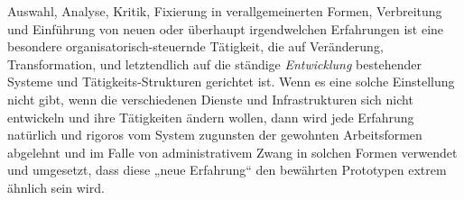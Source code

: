 \documentclass[11pt,a4paper]{article}
\begin{document}
Auswahl, Analyse, Kritik, Fixierung in verallgemeinerten Formen, Verbreitung
und Einführung von neuen oder überhaupt irgendwelchen Erfahrungen ist eine
besondere organisatorisch-steuernde Tätigkeit, die auf Veränderung,
Transformation, und letztendlich auf die ständige \emph{Entwicklung}
bestehender Systeme und Tätigkeits-Strukturen gerichtet ist. Wenn es eine
solche Einstellung nicht gibt, wenn die verschiedenen Dienste und
Infrastrukturen sich nicht entwickeln und ihre Tätigkeiten ändern wollen, dann
wird jede Erfahrung natürlich und rigoros vom System zugunsten der gewohnten
Arbeitsformen abgelehnt und im Falle von administrativem Zwang in solchen
Formen verwendet und umgesetzt, dass diese „neue Erfahrung“ den bewährten
Prototypen extrem ähnlich sein wird.
\end{document}
